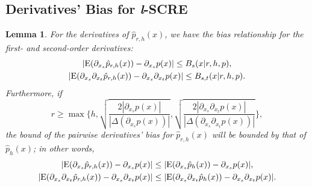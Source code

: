 \documentclass[aos,preprint]{imsart}
\newtheorem{lemma}[theorem]{Lemma}
\theoremstyle{remark}
\begin{document}
\begin{appendix}
\subsection{Derivatives' Bias for {\it l}-SCRE}
\begin{lemma} \label{lSCRE}For the derivatives of $\hat{p}_{r,h}(x)$, we have the bias relationship for the first- and second-order derivatives:
\begin{gather*}\label{order11}
|{\rm E}( \partial_{x_s}  \hat{p}_{r,h}(x)) -  \partial_{x_s } p(x)|  \leq B_s(x| r,h, p)  ,\\
|{\rm E} (\partial_{x_s} \partial_{x_t}   \hat{p}_{r, h}(x)) -  \partial_{x_s} \partial_{x_t} p(x)| \leq B_{s,t}(x| r,h, p).
\end{gather*}
Furthermore, if  
\begin{equation}\label{condition1}
r \geq\max \{ h, \sqrt{\frac{2|\partial_{x_s} p(x)|}{ |\Delta(\partial_{x_s} p(x))|}} , \sqrt{\frac{2|\partial_{x_s} \partial_{x_t} p(x)|}{ |\Delta(\partial_{x_s}\partial_{x_t} p(x))|}}\},
\end{equation}
the bound of the pairwise derivatives' bias for $\hat{p}_{r,h}(x)$ %
will be bounded by that of $\hat{p}_h(x)$; in other words,
\begin{gather*}\label{bias_bound2}
|{\rm E}( \partial_{x_s}  \hat{p}_{r,h}(x)) -  \partial_{x_s } p(x)| \leq |{\rm E}( \partial_{x_s}  \hat{p}_{h}(x)) -  \partial_{x_s } p(x)|,\\
|{\rm E}( \partial_{x_s} \partial_{x_t} \hat{p}_{r,h}(x)) - \partial_{x_s} \partial_{x_t} p(x)| \leq |{\rm E}( \partial_{x_s}  \partial_{x_t} \hat{p}_{h}(x)) -  \partial_{x_s }\partial_{x_t} p(x)|.
\end{gather*}
\end{lemma}


\end{appendix}
\end{document}
